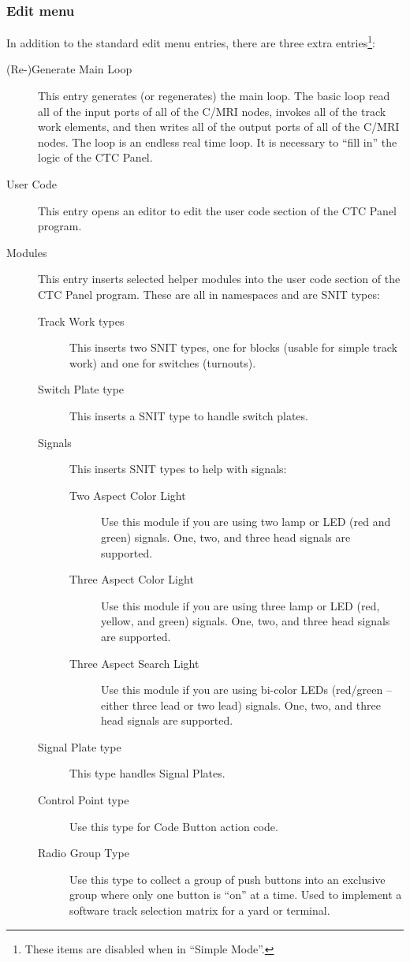 \subsubsection{Edit menu}

In addition to the standard edit menu entries, there are three extra
entries\footnote{These items are disabled when in ``Simple Mode''.}:

\begin{description}
  \item[(Re-)Generate Main Loop] This entry generates (or regenerates)
the main loop.  The basic loop read all of the input ports of all of the
C/MRI nodes, invokes all of the track work elements, and then writes all
of the output ports of all of the C/MRI nodes.  The loop is an endless
real time loop.  It is necessary to ``fill in'' the logic of the CTC Panel.
  \item[User Code] This entry opens an editor to edit the user code
section of the CTC Panel program.
  \item[Modules] This entry inserts selected helper modules into the
user code section of the CTC Panel program.  These are all in namespaces
and are SNIT types:
    \begin{description}
      \item[Track Work types] This inserts two SNIT types, one for
blocks (usable for simple track work) and one for switches (turnouts).
      \item[Switch Plate type] This inserts a SNIT type to handle switch
plates. 
      \item[Signals] This inserts SNIT types to help with signals:
	\begin{description}
	   \item[Two Aspect Color Light] Use this module if you are
using two lamp or LED (red and green) signals.  One, two, and three head
signals are supported.
	   \item[Three Aspect Color Light] Use this module if you are
using three  lamp or LED (red,  yellow,  and green) signals.  One, two,
and three head signals are supported.
	   \item[Three Aspect Search Light] Use this module if you are 
using bi-color LEDs (red/green -- either three lead or two lead)
signals.  One, two, and three head signals are supported.
	\end{description}
      \item[Signal Plate type] This type handles Signal Plates.
      \item[Control Point type] Use this type for Code Button action code.
      \item[Radio Group Type] Use this type to collect a group of push 
buttons into an exclusive group where only one button is ``on'' at a
time.  Used to implement a software track selection matrix for a yard or
terminal.
    \end{description}
\end{description}

